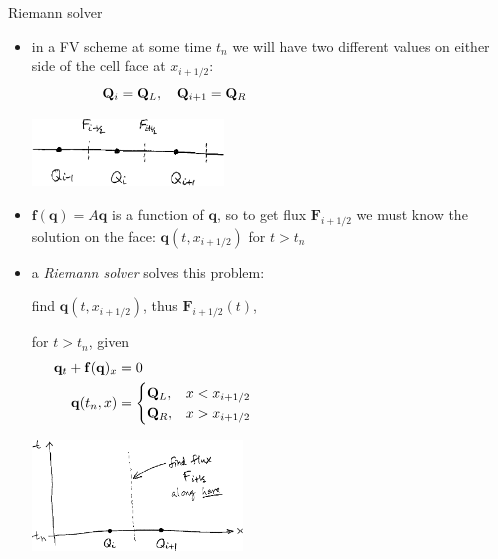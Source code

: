 \documentclass[10pt,hyperref,dvipsnames]{beamer}
\newcommand{\bbf}{\mathbf{f}}
\newcommand{\bq}{\mathbf{q}}
\newcommand{\bF}{\mathbf{F}}
\newcommand{\bQ}{\mathbf{Q}}
\begin{document}
\begin{frame}{Riemann solver}

\begin{itemize}
\item in a FV scheme at some time $t_n$ we will have two different values on either side of the cell face at $x_{i+1/2}$:
    $$\bQ_{i} = \bQ_L, \quad \bQ_{i+1} = \bQ_R \hspace{50mm}$$

\vspace{-12mm}
\hfill \includegraphics[width=0.4\textwidth]{figs/cellfluxsketch}

\medskip
\item $\bbf(\bq) = A\bq$ is a function of $\bq$, so to get flux $\bF_{i+1/2}$ we must know the solution on the face: $\bq(t,x_{i+1/2})$ for $t > t_n$
\item a \emph{Riemann solver} solves this problem:

\bigskip
find $\bq(t,x_{i+1/2})$, thus $\bF_{i+1/2}(t)$,

for $t > t_n$, given
\begin{align*}
\bq_t + \bbf(\bq)_x &= 0 \\
\bq(t_n,x) &= \begin{cases} \bQ_L, & x < x_{i+1/2} \\
                            \bQ_R, & x > x_{i+1/2} \end{cases} \hspace{60mm}
\end{align*}

\vspace{-30mm}
\hfill \includegraphics[width=0.44\textwidth]{figs/rsolversketch}
\end{itemize}
\end{frame}
\end{document}
